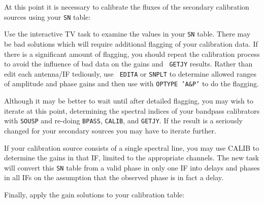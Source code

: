 At this point it is necessary to calibrate the fluxes of the secondary
calibration sources using your {\tt SN} table:

Use the interactive TV task {\tt {}} to examine the values
in your {\tt SN} table.  There may be bad solutions which will require
additional flagging of your calibration data.  If there is a
significant amount of flagging, you should repeat the calibration
process to avoid the influence of bad data on the gains and {\tt
GETJY} results.  Rather than edit each antenna/IF tediously, use {\tt
EDITA} or {\tt SNPLT} to determine allowed ranges of amplitude and
phase gains and then use {\tt {}} with {\tt OPTYPE 'A\&P'}
to do the flagging.

Although it may be better to wait until after detailed flagging,
you may wish to iterate at this point, determining the spectral
indices of your bandpass calibrators with {\tt SOUSP} and re-doing
{\tt BPASS}, {\tt CALIB}, and {\tt GETJY}\@.  If the result is a
seriously changed  for your secondary sources you
may have to iterate further.

If your calibration source consists of a single spectral line, you may
use CALIB to determine the gains in that IF, limited to the
appropriate channels.  The new task {\tt {}} will convert
this {\tt SN} table from a valid phase in only one IF into delays and
phases in all IFs on the assumption that the observed phase is in fact
a delay.

Finally, apply the gain solutions to your calibration table:


